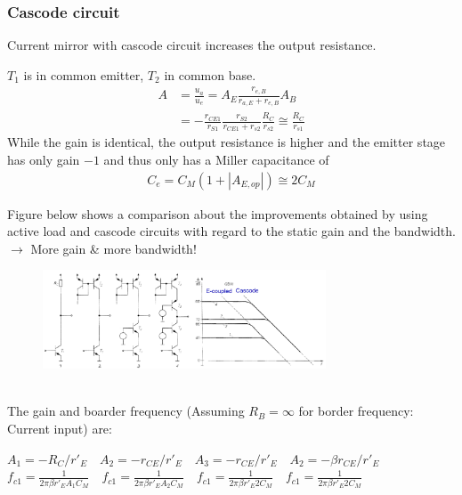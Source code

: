 		\subsubsection{Cascode circuit}
			Current mirror with cascode circuit increases the output resistance. 
			\begin{multicols}{2}
				\begin{center}
					
				\end{center}
				\vfill
				\columnbreak
				$T_1$ is in common emitter, $T_2$ in common base.
				\begin{align}
					A &= \frac{u_a}{u_e} = A_E \frac{r_{e,B}}{r_{a,E} + r_{e,B}} A_B \nonumber \\
					 &= -\frac{r_{CE1}}{r_{S1}} \frac{r_{S2}}{r_{CE1}+r_{s2}} \frac{R_C}{r_{s2}} \cong \frac{R_C}{r_{s1}}
				\end{align}
				While the gain is identical, the output resistance is higher and the emitter stage has only gain $-1$ and thus only has a Miller capacitance of
				\begin{align}
					C_e = C_M \left( 1 + |A_{E,op}| \right) \cong 2 C_M
				\end{align}
			\end{multicols}
			
			Figure below shows a comparison about the improvements obtained by using active load and cascode circuits with regard to the static gain and the bandwidth. \\
			$\rightarrow$ More gain \& more bandwidth!
			\begin{figure}[h]
				\centering
				\includegraphics[width=0.75\textwidth]{images/Comparison.png}
				\caption{}
				\label{Fig:Comparison}
			\end{figure}\\
			The gain and boarder frequency (Assuming $R_B = \infty$ for border frequency: Current input) are:
			
			$A_1 = -R_C/r'_E \quad A_2 = -r_{CE}/r'_E \quad A_3 = -r_{CE}/r'_E \quad A_2 = -\beta r_{CE}/r'_E$\\
			$f_{c1} = \frac{1}{2 \pi \beta r'_E A_1 C_M} \quad f_{c1} = \frac{1}{2 \pi \beta r'_E A_2 C_M} \quad f_{c1} = \frac{1}{2 \pi \beta r'_E 2 C_M}\quad f_{c1} = \frac{1}{2 \pi \beta r'_E 2 C_M}$
			
